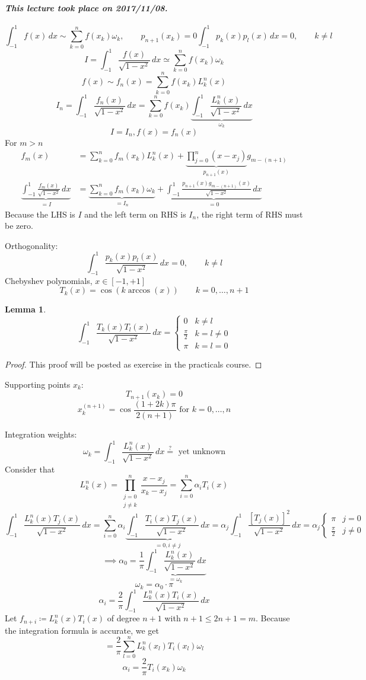 \documentclass{article}
\newtheorem*{lemma}{Lemma}
\newcommand{\dateref}[1]{\paragraph{\textit{This lecture took place on #1.}}}
\begin{document}
\dateref{2017/11/08}

\[ \int_{-1}^1 f(x) \, dx \sim \sum_{k=0}^n f(x_k) \omega_k, \qquad p_{n+1}(x_k) = 0 \int_{-1}^1 p_k(x) p_l(x) \, dx = 0, \qquad k \neq l \]
\[ I = \int_{-1}^1 \frac{f(x)}{\sqrt{1 - x^2}} \, dx \simeq \sum_{k=0}^n f(x_k) \omega_k \]
\[ f(x) \sim f_n(x) = \sum_{k=0}^n f(x_k) L_k^n(x) \]
\[ I_n = \int_{-1}^1 \frac{f_n(x)}{\sqrt{1 - x^2}} \, dx = \sum_{k=0}^n f(x_k) \underbrace{\int_{-1}^1 \frac{L_k^n(x)}{\sqrt{1 - x^2}} \, dx}_{\omega_k} \]
\[ I = I_n, f(x) = f_n(x) \]
For $m > n$
\begin{align*}
  f_m(x) &= \sum_{k=0}^n f_m(x_k) L_k^n(x) + \underbrace{\prod_{j=0}^n (x - x_j)}_{p_{n+1}(x)} g_{m - (n+1)} \\
  \underbrace{\int_{-1}^1 \frac{f_m(x)}{\sqrt{1 - x^2}} \, dx}_{=I} &= \underbrace{\sum_{k=0}^n f_m(x_k) \omega_k}_{=I_n} + \underbrace{\int_{-1}^1 \frac{p_{n+1}(x) g_{m-(n+1)}(x)}{\sqrt{1 - x^2}} \, dx}_{=0}
\end{align*}
Because the LHS is $I$ and the left term on RHS is $I_n$, the right term of RHS must be zero.

Orthogonality:
\[ \int_{-1}^1 \frac{p_k(x) p_l(x)}{\sqrt{1 - x^2}} \, dx = 0, \qquad k \neq l \]
Chebyshev polynomials, $x \in [-1, +1]$
\[ T_k(x) = \cos(k \arccos(x)) \qquad k = 0,\ldots,n+1 \]
\begin{lemma}
  \[ \int_{-1}^1 \frac{T_k(x) T_l(x)}{\sqrt{1 - x^2}} \, dx = \begin{cases} 0 & k \neq l \\ \frac\pi2 & k = l \neq 0 \\ \pi & k = l = 0 \end{cases} \]
\end{lemma}
\begin{proof}
  This proof will be posted as exercise in the practicals course.
\end{proof}

Supporting points $x_k$:
\[ T_{n+1}(x_k) = 0 \]
\[ x_k^{(n+1)} = \cos\frac{(1 + 2k) \pi}{2(n+1)} \text{ for } k = 0,\ldots,n \]

Integration weights:
\[ \omega_k = \int_{-1}^1 \frac{L_k^n(x)}{\sqrt{1 - x^2}} \, dx \stackrel{?}{=} \text{ yet unknown} \]
Consider that
\[ L_k^n(x) = \prod_{\substack{j = 0 \\ j \neq k}}^n \frac{x - x_j}{x_k - x_j} = \sum_{i=0}^n \alpha_i T_i(x) \]
\[ \int_{-1}^1 \frac{L_k^n(x) T_j(x)}{\sqrt{1 - x^2}} \, dx = \sum_{i=0}^n \alpha_i \underbrace{\int_{-1}^1 \frac{T_i(x) T_j(x)}{\sqrt{1 - x^2}} \, dx}_{=0, i \neq j} = \alpha_j \int_{-1}^1 \frac{[T_j(x)]^2}{\sqrt{1 - x^2}} \, dx = \alpha_j \begin{cases} \pi & j = 0 \\ \frac\pi2 & j \neq 0 \end{cases} \]
\[ \implies \alpha_0 = \frac1\pi \underbrace{\int_{-1}^1 \frac{L_k^n(x)}{\sqrt{1 - x^2}} \, dx}_{=\omega_k} \]
\[ \omega_k = \alpha_0 \cdot \pi \]
\[ \alpha_i = \frac{2}{\pi} \int_{-1}^1 \frac{L_k^n(x) T_i(x)}{\sqrt{1 - x^2}} \, dx \]
Let $f_{n+i} \coloneqq L_k^n(x) T_i(x)$ of degree $n+1$ with $n+1 \leq 2n+1=m$.
Because the integration formula is accurate, we get
\[ = \frac{2}{\pi} \sum_{l=0}^n L_k^n(x_l) T_i(x_l) \omega_l \]
\[ \alpha_i = \frac{2}{\pi} T_i(x_k) \omega_k \]
\end{document}
